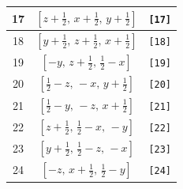 \documentclass[fleqn,8pt]{jsarticle}
\begin{document}
\begin{longtable}{ccc}
17 & $\left[ z + \frac{1}{2},\, x + \frac{1}{2},\, y + \frac{1}{2} \right]$ & {\tt [17]} \\ \hline
18 & $\left[ y + \frac{1}{2},\, z + \frac{1}{2},\, x + \frac{1}{2} \right]$ & {\tt [18]} \\ \hline
19 & $\left[ - y,\, z + \frac{1}{2},\, \frac{1}{2} - x \right]$ & {\tt [19]} \\ \hline
20 & $\left[ \frac{1}{2} - z,\, - x,\, y + \frac{1}{2} \right]$ & {\tt [20]} \\ \hline
21 & $\left[ \frac{1}{2} - y,\, - z,\, x + \frac{1}{2} \right]$ & {\tt [21]} \\ \hline
22 & $\left[ z + \frac{1}{2},\, \frac{1}{2} - x,\, - y \right]$ & {\tt [22]} \\ \hline
23 & $\left[ y + \frac{1}{2},\, \frac{1}{2} - z,\, - x \right]$ & {\tt [23]} \\ \hline
24 & $\left[ - z,\, x + \frac{1}{2},\, \frac{1}{2} - y \right]$ & {\tt [24]} \\
\end{longtable}
\end{document}

